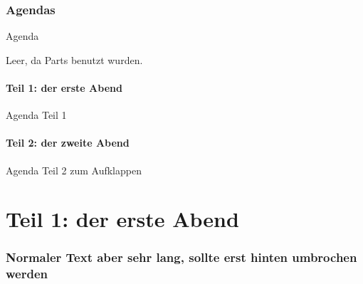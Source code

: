 	\section*{Agendas}

	\begin{frame}{Agenda}
		\tableofcontents

		Leer, da Parts benutzt wurden.
	\end{frame}


	\subsection*{Teil 1: der erste Abend}

	\begin{frame}{Agenda Teil 1}
		\tableofcontents[part=1, subsectionstyle=hide]
	\end{frame}


	\subsection*{Teil 2: der zweite Abend}

	\begin{frame}{Agenda Teil 2 zum Aufklappen}
		\tableofcontents[part=2, pausesections]
	\end{frame}






	\part{Teil 1: der erste Abend}

	\frame{\partpage}

	\section{Normaler Text aber sehr lang, sollte erst hinten umbrochen werden}

